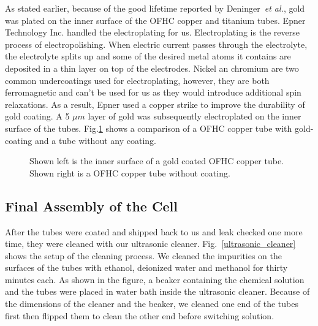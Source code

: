 As stated earlier, because of the good lifetime reported by Deninger~\emph{et al.}, gold was plated on the inner surface of the OFHC copper and titanium tubes. Epner Technology Inc. handled the electroplating for us. Electroplating is the reverse process of electropolishing. When electric current passes through the electrolyte, the electrolyte splits up and some of the desired metal atoms it contains are deposited in a thin layer on top of the electrodes. Nickel an chromium are two common undercoatings used for electroplating, however, they are both ferromagnetic and can't be used for us as they would introduce additional spin relaxations. As a result, Epner used a copper strike to improve the durability of gold coating. A 5 $\mu m$ layer of gold was subsequently electroplated on the inner surface of the tubes. Fig.\ref{gold_coating} shows a comparison of a OFHC copper tube with gold-coating and a tube without any coating. 

\begin{figure}[t!]
	\centering
	\caption{{Shown left is the inner surface of a gold coated OFHC copper tube. Shown right is a OFHC copper tube without coating.}}
	\label{gold_coating}
\end{figure}

\subsection{Final Assembly of the Cell}

After the tubes were coated and shipped back to us and leak checked one more time, they were cleaned with our ultrasonic cleaner. Fig.~\ref{ultrasonic_cleaner} shows the setup of the cleaning process. We cleaned the impurities on the surfaces of the tubes with ethanol, deionized water and methanol for thirty minutes each. As shown in the figure, a beaker containing the chemical solution and the tubes were placed in water bath inside the ultrasonic cleaner. Because of the dimensions of the cleaner and the beaker, we cleaned one end of the tubes first then flipped them to clean the other end before switching solution.

